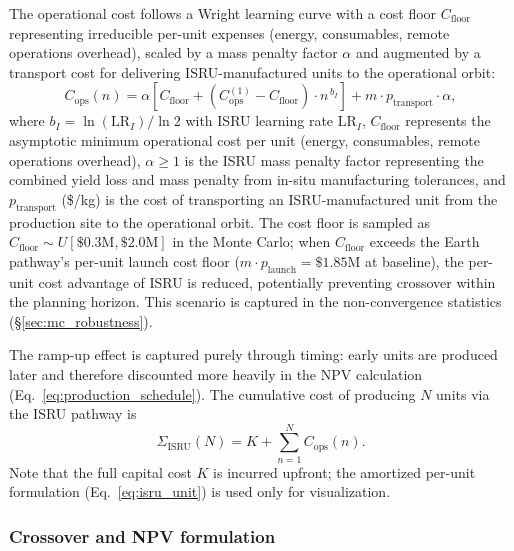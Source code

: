 \documentclass[preprint,12pt]{elsarticle}
\begin{document}
The operational cost follows a Wright learning curve with a cost floor $C_{\mathrm{floor}}$ representing irreducible per-unit expenses (energy, consumables, remote operations overhead), scaled by a mass penalty factor $\alpha$ and augmented by a transport cost for delivering ISRU-manufactured units to the operational orbit:
\begin{equation}
  C_{\mathrm{ops}}(n) = \alpha \left[ C_{\mathrm{floor}} + \left(C_{\mathrm{ops}}^{(1)} - C_{\mathrm{floor}}\right) \cdot n^{\,b_I} \right] + m \cdot p_{\mathrm{transport}} \cdot \alpha,
  \label{eq:isru_ops}
\end{equation}
where $b_I = \ln(\mathrm{LR}_I)/\ln 2$ with ISRU learning rate $\mathrm{LR}_I$, $C_{\mathrm{floor}}$ represents the asymptotic minimum operational cost per unit (energy, consumables, remote operations overhead), $\alpha \geq 1$ is the ISRU mass penalty factor representing the combined yield loss and mass penalty from in-situ manufacturing tolerances, and $p_{\mathrm{transport}}$ (\$/kg) is the cost of transporting an ISRU-manufactured unit from the production site to the operational orbit. The cost floor is sampled as $C_{\mathrm{floor}} \sim U[\$0.3\text{M}, \$2.0\text{M}]$ in the Monte Carlo; when $C_{\mathrm{floor}}$ exceeds the Earth pathway's per-unit launch cost floor ($m \cdot p_{\mathrm{launch}} = \$1.85$M at baseline), the per-unit cost advantage of ISRU is reduced, potentially preventing crossover within the planning horizon. This scenario is captured in the non-convergence statistics (\S\ref{sec:mc_robustness}).

The ramp-up effect is captured purely through timing: early units are produced later and therefore discounted more heavily in the NPV calculation (Eq.~\ref{eq:production_schedule}). The cumulative cost of producing $N$ units via the ISRU pathway is
\begin{equation}
  \Sigma_{\mathrm{ISRU}}(N) = K + \sum_{n=1}^{N} C_{\mathrm{ops}}(n).
  \label{eq:isru_cum}
\end{equation}
Note that the full capital cost $K$ is incurred upfront; the amortized per-unit formulation (Eq.~\ref{eq:isru_unit}) is used only for visualization.

\subsubsection{Crossover and NPV formulation}
\end{document}
